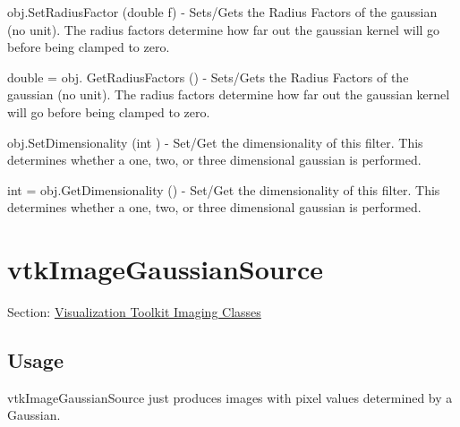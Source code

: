 \begin{DoxyItemize}
\item {\ttfamily obj.\-Set\-Radius\-Factor (double f)} -\/ Sets/\-Gets the Radius Factors of the gaussian (no unit). The radius factors determine how far out the gaussian kernel will go before being clamped to zero.  
\item {\ttfamily double = obj. Get\-Radius\-Factors ()} -\/ Sets/\-Gets the Radius Factors of the gaussian (no unit). The radius factors determine how far out the gaussian kernel will go before being clamped to zero.  
\item {\ttfamily obj.\-Set\-Dimensionality (int )} -\/ Set/\-Get the dimensionality of this filter. This determines whether a one, two, or three dimensional gaussian is performed.  
\item {\ttfamily int = obj.\-Get\-Dimensionality ()} -\/ Set/\-Get the dimensionality of this filter. This determines whether a one, two, or three dimensional gaussian is performed.  
\end{DoxyItemize}\hypertarget{vtkimaging_vtkimagegaussiansource}{}\section{vtk\-Image\-Gaussian\-Source}\label{vtkimaging_vtkimagegaussiansource}
Section\-: \hyperlink{sec_vtkimaging}{Visualization Toolkit Imaging Classes} \hypertarget{vtkwidgets_vtkxyplotwidget_Usage}{}\subsection{Usage}\label{vtkwidgets_vtkxyplotwidget_Usage}
vtk\-Image\-Gaussian\-Source just produces images with pixel values determined by a Gaussian.

